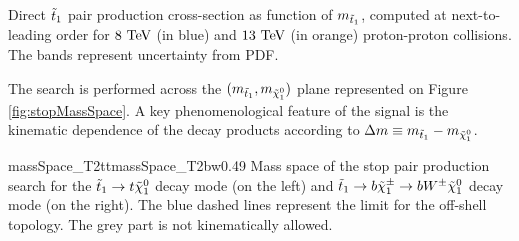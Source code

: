         {Direct $\tilde{t}_1$ pair production cross-section as function of $m_{\tilde{t}_1}$, computed at next-to-leading order
        for $8~\text{TeV}$ (in blue) and $13~\text{TeV}$ (in orange) proton-proton collisions. The bands represent uncertainty from PDF.}

        The search is performed across the $(m_{\tilde{t}_1},m_{\tilde{\chi}_1^0})$ plane 
        represented on Figure \ref{fig:stopMassSpace}. A key phenomenological feature of the signal is the
        kinematic dependence of the decay products according to $\Delta m \equiv m_{\tilde{t}_1} - m_{\tilde{\chi}_1^0}$.





                     {massSpace_T2tt}{massSpace_T2bw}{0.49}
                     {Mass space of the stop pair production search for the $\tilde{t}_1 
                     \rightarrow t \tilde{\chi}_1^0$ decay mode (on the left) and $\tilde{t}_1 
                     \rightarrow b \tilde{\chi}_1^\pm \rightarrow b W^{\pm} \tilde{\chi}_1^0 $ decay 
                     mode (on the right). The blue dashed lines represent the limit for 
                     the off-shell topology. The grey part is not kinematically allowed.}
 
